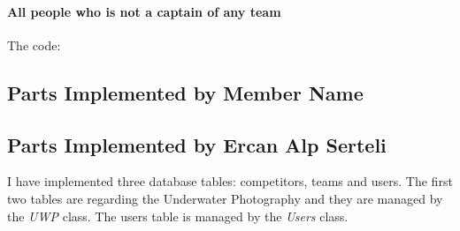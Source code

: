 \documentclass[a4paper,10pt,english]{sphinxmanual}
\begin{document}
\paragraph{All people who is not a captain of any team}
\label{developer/member2:all-people-who-is-not-a-captain-of-any-team}\begin{quote}

\end{quote}

The code:
\begin{quote}

\end{quote}


\subsection{Parts Implemented by Member Name}
\label{developer/member3:parts-implemented-by-member-name}\label{developer/member3::doc}

\subsection{Parts Implemented by Ercan Alp Serteli}
\label{developer/member4:parts-implemented-by-ercan-alp-serteli}\label{developer/member4::doc}
I have implemented three database tables: competitors, teams and users. The first two tables are regarding the Underwater Photography and they are managed by the \emph{UWP} class. The users table is managed by the \emph{Users} class.
\end{document}
